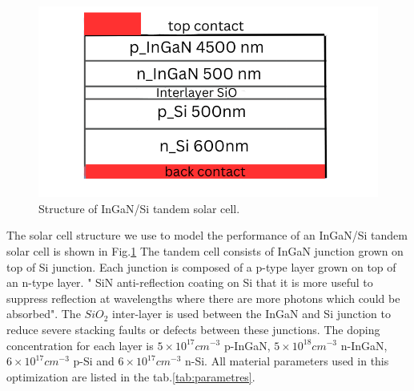 \documentclass[preprint,12pt]{elsarticle}
\begin{document}
\begin{figure}[]
	\centering
	\includegraphics[width=0.7\linewidth]{Figure/Struct}
	\caption{Structure of InGaN/Si tandem solar cell.}
	\label{fig:structure}
\end{figure}
The solar cell structure we use to model the performance of an InGaN/Si tandem solar cell is shown in Fig.\ref{fig:structure} The tandem cell consists of InGaN junction grown on top of Si junction. Each junction is composed of a p-type layer grown on top of an n-type layer. " SiN anti-reflection coating on Si that it is more useful to suppress reflection at wavelengths where there are more photons which could be  absorbed". The $SiO_{2}$ inter-layer is used between the InGaN and Si junction to reduce severe stacking faults or defects between these junctions. The doping concentration for each layer is $5\times10^{17} cm^{-3}$ p-InGaN, $5\times10^{18} cm^{-3}$ n-InGaN, $6\times10^{17} cm^{-3}$ p-Si and $6\times10^{17} cm^{-3}$ n-Si. All material parameters used in this optimization are listed in the tab.\ref{tab:parametres}. 
\end{document}
